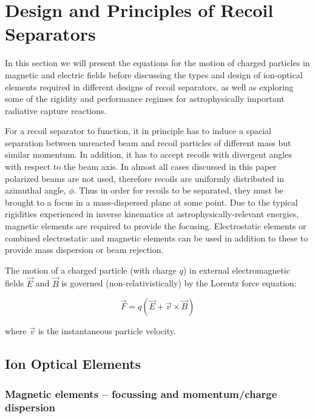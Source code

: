 \section{Design and Principles of Recoil Separators}
\label{emsep}

In this section we will present the equations for the motion of charged particles in magnetic and electric fields before discussing the types and design of ion-optical elements required in different designs of recoil separators, as well as exploring some of the rigidity and performance regimes for astrophysically important radiative capture reactions. 

For a recoil separator to function, it in principle has to induce a spacial separation between unreacted beam and recoil particles of different mass but similar momentum. In addition, it has to accept recoils with divergent angles with respect to the beam axis. In almost all cases discussed in this paper polarized beams are not used, therefore recoils are uniformly distributed in azimuthal angle, $\phi$. 
Thus in order for recoils to be separated, they must be brought to a focus in a mass-dispersed plane at some point. Due to the typical rigidities experienced in inverse kinematics at astrophysically-relevant energies, magnetic elements are required to provide the focusing. Electrostatic elements or combined electrostatic and magnetic elements can be used in addition to these to provide mass dispersion or beam rejection.  

The motion of a charged particle (with charge $q$) in external electromagnetic fields $\vec{E}$ and $\vec{B}$  is governed (non-relativistically) by the Lorentz force equation:

\begin{equation}
\vec{F}=q(\vec{E}+\vec{v}\times\vec{B})
\end{equation}   

where $\vec{v}$ is the instantaneous particle velocity. 

\subsection{Ion Optical Elements}

\subsubsection{Magnetic elements -- focussing and momentum/charge dispersion}\label{magel}

